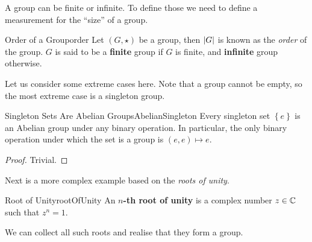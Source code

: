 \documentclass[math]{amznotes}
\theoremstyle{remark}
\newcommand{\0}{\mathbf{0}}
\newcommand{\1}{\mathbf{1}}
\begin{document}
A group can be finite or infinite. To define those we need to define a measurement for the ``size'' of a group.
\begin{dfnbox}{Order of a Group}{order}
    Let $\left(G, \star\right)$ be a group, then ${\left\lvert {G} \right\rvert}$ is known as the \textit{order} of the group. $G$ is said to be a {\color{red} \textbf{finite}} group if $G$ is finite, and {\color{red} \textbf{infinite}} group otherwise.
\end{dfnbox}
Let us consider some extreme cases here. Note that a group cannot be empty, so the most extreme case is a singleton group.
\begin{probox}{Singleton Sets Are Abelian Groups}{AbelianSingleton}
    Every singleton set $\left\{e\right\}$ is an Abelian group under any binary operation. In particular, the only binary operation under which the set is a group is $\left(e, e\right) \mapsto e$.
    \tcblower
    \begin{proof}
        Trivial.
    \end{proof}
\end{probox}
Next is a more complex example based on the \textit{roots of unity}.
\begin{dfnbox}{Root of Unity}{rootOfUnity}
    An {\color{red} \textbf{$n$-th root of unity}} is a complex number $z \in \mathbb{C}$ such that $z^n = 1$.
\end{dfnbox}
We can collect all such roots and realise that they form a group.
\end{document}
